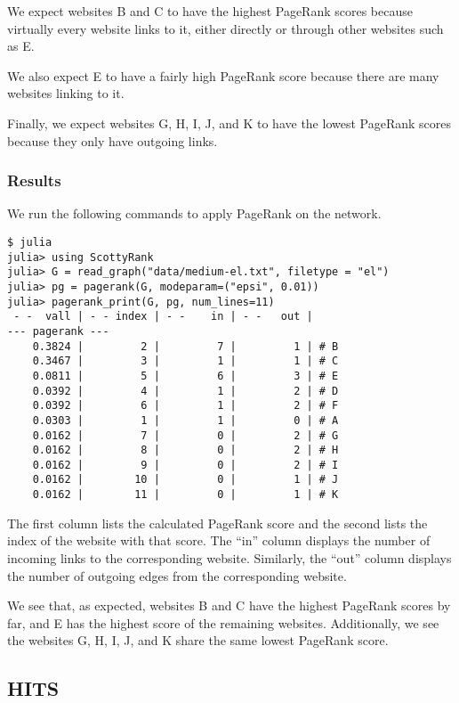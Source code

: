 \documentclass[12pt, titlepage, twoside]{amsart}
\begin{document}
We expect websites B and C to have the highest PageRank scores because virtually every website links to it,
either directly or through other websites such as E.

We also expect E to have a fairly high PageRank score because there are many websites linking to it.

Finally, we expect websites G, H, I, J, and K to have the lowest PageRank scores because they only have outgoing links.

\subsubsection{Results}

We run the following commands to apply PageRank on the network.

\begin{verbatim}
$ julia
julia> using ScottyRank
julia> G = read_graph("data/medium-el.txt", filetype = "el")
julia> pg = pagerank(G, modeparam=("epsi", 0.01))
julia> pagerank_print(G, pg, num_lines=11)
 - -  vall | - - index | - -    in | - -   out |
--- pagerank ---
    0.3824 |         2 |         7 |         1 | # B
    0.3467 |         3 |         1 |         1 | # C
    0.0811 |         5 |         6 |         3 | # E
    0.0392 |         4 |         1 |         2 | # D
    0.0392 |         6 |         1 |         2 | # F
    0.0303 |         1 |         1 |         0 | # A
    0.0162 |         7 |         0 |         2 | # G
    0.0162 |         8 |         0 |         2 | # H
    0.0162 |         9 |         0 |         2 | # I
    0.0162 |        10 |         0 |         1 | # J
    0.0162 |        11 |         0 |         1 | # K
\end{verbatim}

The first column lists the calculated PageRank score and
the second lists the index of the website with that score.
The ``in'' column displays the number of incoming links to the corresponding website.
Similarly, the ``out'' column displays the number of outgoing edges from the corresponding website.

We see that, as expected, websites B and C have the highest PageRank scores by far,
and E has the highest score of the remaining websites.
Additionally, we see the websites G, H, I, J, and K share the same lowest PageRank score.

\subsection{HITS}
\end{document}
